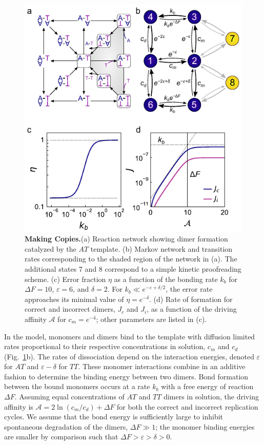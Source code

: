 \begin{appendices}
\begin{figure}[h!]
    \centering
    \includegraphics{figures/A5_MakingCopies.pdf}
    \caption{\textbf{Making Copies.}(a) Reaction network showing dimer formation catalyzed by the $AT$ template. (b) Markov network and transition rates corresponding to the shaded region of the network in (a). The additional states 7 and 8 correspond to a simple kinetic proofreading scheme. (c) Error fraction $\eta$ as a function of the bonding rate $k_b$ for $\Delta F = 10$, $\varepsilon = 6$, and $\delta=2$. For $k_b\ll e^{-\varepsilon+\delta/2}$, the error rate approaches its minimal value of $\eta=e^{-\delta}$. (d) Rate of formation for correct and incorrect dimers, $J_c$ and $J_i$, as a function of the driving affinity $\mathcal{A}$ for $c_m=e^{-4}$; other parameters are listed in (c). }
    \label{fig:MakingCopies}
\end{figure}

In the model, monomers and dimers bind to the template with diffusion limited rates proportional to their respective concentrations in solution, $c_m$ and $c_d$ (Fig.~\ref{fig:MakingCopies}b). The rates of dissociation depend on the interaction energies, denoted $\varepsilon$ for $AT$ and $\varepsilon-\delta$ for $TT$. These monomer interactions combine in an additive fashion to determine the binding energy between two dimers. Bond formation between the bound monomers occurs at a rate $k_b$ with a free energy of reaction $\Delta F$.  Assuming equal concentrations of $AT$ and $TT$ dimers in solution, the driving affinity is $\mathcal{A} = 2\ln(c_m/c_d) + \Delta F$ for both the correct and incorrect replication cycles.  We assume that the bond energy is sufficiently large to inhibit spontaneous degradation of the dimers, $\Delta F\gg1$; the monomer binding energies are smaller by comparison such that $\Delta F> \varepsilon>\delta >0 $.


\end{appendices}
